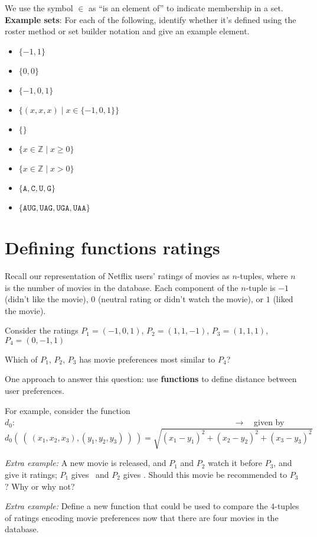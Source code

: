 \documentclass[12pt, oneside]{article}
\newcommand{\A}[0]{\texttt{A}}
\newcommand{\C}[0]{\texttt{C}}
\newcommand{\G}[0]{\texttt{G}}
\newcommand{\U}[0]{\texttt{U}}
\newcommand{\cmark}{\ding{51}}
\newcommand{\xmark}{\ding{55}}
\begin{document}
We use the symbol $\in$ as ``is an element of'' to indicate membership in a set.\\


{\bf Example sets}: For each of the following, identify whether it's defined using the roster method
or set builder notation and give an example element.
\begin{itemize}
    \item[]$\{ -1, 1\}$\\
    \item[]$\{0, 0 \}$\\
    \item[]$\{-1, 0, 1 \}$\\
    \item[]$\{(x,x,x) \mid x \in \{-1,0,1\} \}$\\
    \item[]$\{ \}$\\
    \item[]$\{ x \in \mathbb{Z} \mid x \geq 0 \}$\\
    \item[]$\{ x \in \mathbb{Z}  \mid x > 0 \}$\\
    \item[]$\{\A,\C,\U,\G\}$ \\
    \item[]$\{\A\U\G, \U\A\G, \U\G\A, \U\A\A \}$\\
\end{itemize}
 \vfill
\section*{Defining functions ratings}


Recall our representation of Netflix users' ratings of movies as $n$-tuples, where
$n$ is the number of movies in the database. 
Each component of the $n$-tuple is $-1$ (didn't like the movie), $0$ 
(neutral rating or didn't watch the movie), or $1$ (liked the movie).

Consider the ratings $P_1 = (-1, 0, 1)$, $P_2 = (1, 1, -1)$, $P_3 = (1, 1, 1)$,
$P_4 = (0,-1,1)$


Which of $P_1$, $P_2$, $P_3$ has movie preferences most similar to $P_4$?

One approach to answer this question: use {\bf functions} to define distance between user preferences.

For example, consider the function 
$d_0: \phantom{the Cartesian product of the set of ratings on 3 movies with itself} \to \phantom{\mathbb{R}}$
given by
\[
d_0 (~(~ (x_1, x_2, x_3), (y_1, y_2, y_3) ~) ~) = \sqrt{ (x_1 - y_1)^2 + (x_2 - y_2)^2 + (x_3 -y_3)^2}
\]


\vfill
\vfill


{\it Extra example:} A new movie is released, and $P_1$ and $P_2$ watch it before $P_3$, and give it
ratings; $P_1$ gives \cmark~and $P_2$ gives \xmark.
Should this movie be recommended to $P_3$? Why or why not?

{\it Extra example:} Define a new function that could be used to compare the $4$-tuples of ratings encoding
movie preferences now that there are four movies in the database.

\vfill
\newpage \vfill
\end{document}
